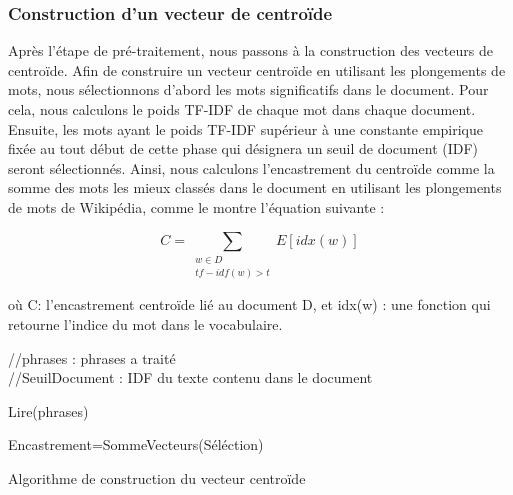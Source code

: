        \subsubsection{Construction d'un vecteur de centroïde}
        Après l'étape de pré-traitement, nous passons à la construction des vecteurs de centroïde. Afin de construire un vecteur centroïde en utilisant les plongements de mots, nous sélectionnons d'abord les mots significatifs dans le document. Pour cela, nous calculons le poids TF-IDF de chaque mot dans chaque document. Ensuite, les mots ayant le poids TF-IDF supérieur à une constante empirique fixée au tout début de cette phase qui désignera un seuil de document (IDF) seront sélectionnés. Ainsi, nous calculons l'encastrement du centroïde comme la somme des mots les mieux classés dans le document en utilisant les plongements de mots de Wikipédia, comme le montre l'équation suivante :

             \begin{equation*}
             C = \sum_{\substack{w\in D\\
                             tf-idf(w)>t }}
                    E[idx(w)]
             \end{equation*}
             
             où C: l'encastrement centroïde lié au document D, et idx(w) : une fonction qui retourne l'indice du mot dans le vocabulaire.\\
             
             \begin{algorithm2e}[H]
                \SetAlgoLined
                //phrases : phrases a traité\\
                //SeuilDocument : IDF du texte contenu dans le document\\
                
                Lire(phrases)\\
                
                Encastrement=SommeVecteurs(Séléction)
                
                \caption{Algorithme de construction du vecteur centroïde}
             \end{algorithm2e}
             
